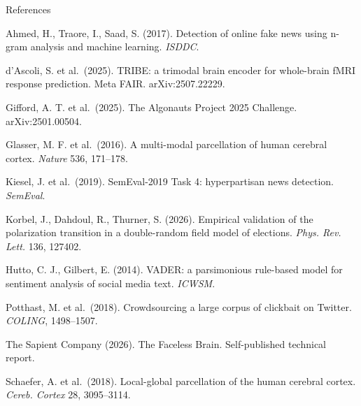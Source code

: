 \documentclass[aspectratio=169,11pt]{beamer}
\begin{document}
\begin{frame}{References}
\vspace{0.5em}
{\footnotesize
Ahmed, H., Traore, I., Saad, S. (2017). Detection of online fake news using n-gram analysis
and machine learning. \emph{ISDDC}.

\vspace{0.35em}
d'Ascoli, S. et al.\ (2025). TRIBE: a trimodal brain encoder for whole-brain fMRI response
prediction. Meta FAIR. arXiv:2507.22229.

\vspace{0.35em}
Gifford, A. T. et al.\ (2025). The Algonauts Project 2025 Challenge. arXiv:2501.00504.

\vspace{0.35em}
Glasser, M. F. et al.\ (2016). A multi-modal parcellation of human cerebral cortex.
\emph{Nature} 536, 171--178.

\vspace{0.35em}
Kiesel, J. et al.\ (2019). SemEval-2019 Task 4: hyperpartisan news detection.
\emph{SemEval}.

\vspace{0.35em}
Korbel, J., Dahdoul, R., Thurner, S. (2026). Empirical validation of the polarization
transition in a double-random field model of elections. \emph{Phys. Rev. Lett.} 136, 127402.

\vspace{0.35em}
Hutto, C. J., Gilbert, E. (2014). VADER: a parsimonious rule-based model for sentiment
analysis of social media text. \emph{ICWSM}.

\vspace{0.35em}
Potthast, M. et al.\ (2018). Crowdsourcing a large corpus of clickbait on Twitter.
\emph{COLING}, 1498--1507.

\vspace{0.35em}
The Sapient Company (2026). The Faceless Brain. Self-published technical report.

\vspace{0.35em}
Schaefer, A. et al.\ (2018). Local-global parcellation of the human cerebral cortex.
\emph{Cereb. Cortex} 28, 3095--3114.
}
\end{frame}
\end{document}
